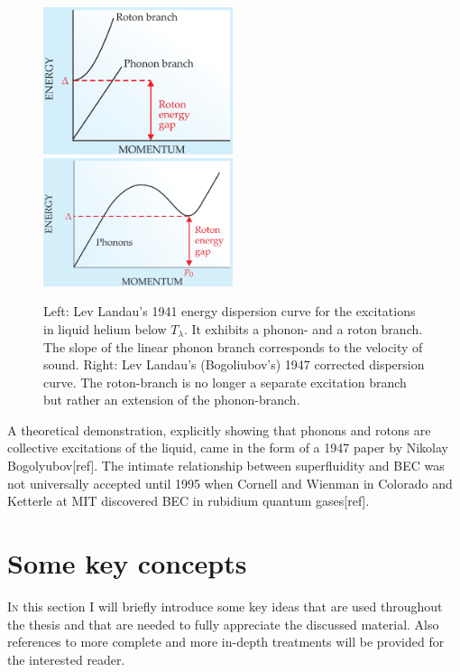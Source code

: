 \documentclass[12pt,a4paper,twosides]{book}
\begin{document}
		\begin{figure}[t]
			\begin{center}
				\includegraphics[width=0.495\textwidth]{phonon-roton-landau-first}
				\includegraphics[width=0.495\textwidth]{phonon-roton-bogoliubov}
			\end{center}
			\caption{Left: Lev Landau's 1941 energy dispersion curve for the excitations in liquid helium below $T_\lambda$. It exhibits a phonon- and a roton branch. The slope of the linear phonon branch corresponds to the velocity of sound. Right: Lev Landau's (Bogoliubov's) 1947 corrected dispersion curve. The roton-branch is no longer a separate excitation branch but rather an extension of the phonon-branch.}
			\label{fig:phonon-roton}
		\end{figure}

		A theoretical demonstration, explicitly showing that phonons and rotons are collective excitations of the liquid, came in the form of a 1947 paper by Nikolay Bogolyubov[ref]. The intimate relationship between superfluidity and BEC was not universally accepted until 1995 when Cornell and Wienman in Colorado and Ketterle at MIT discovered BEC in rubidium quantum gases[ref].

	\clearpage
	\section{Some key concepts}
		\lettrine[lines=3,findent=3pt,nindent=0pt]{I}{n} this section I will briefly introduce some key ideas that are used throughout the thesis and that are needed to fully appreciate the discussed material. Also references to more complete and more in-depth treatments will be provided for the interested reader.
		
\end{document}
